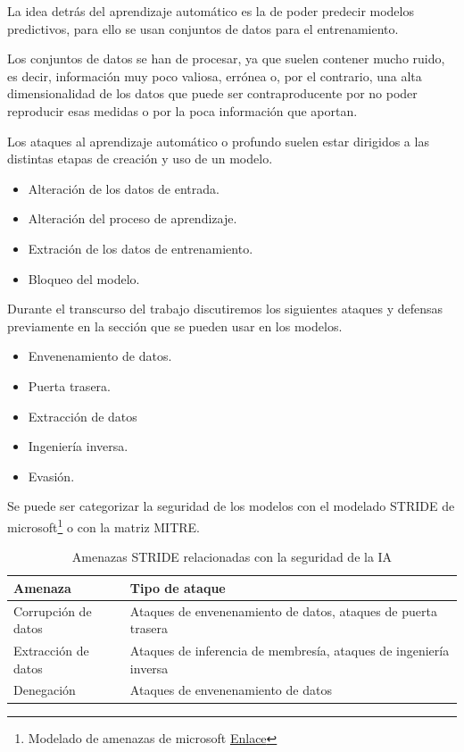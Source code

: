 La idea detrás del aprendizaje automático es la de poder predecir modelos predictivos, para ello se usan conjuntos de datos para el entrenamiento.

Los conjuntos de datos se han de procesar, ya que suelen contener mucho ruido, es decir, información muy poco valiosa, errónea o, por el contrario, una alta dimensionalidad de los datos que puede ser contraproducente por no poder reproducir esas medidas o por la poca información que aportan.

Los ataques al aprendizaje automático o profundo suelen estar dirigidos a las distintas etapas de creación y uso de un modelo.

\begin{itemize}
    \item Alteración de los datos de entrada.
    \item Alteración del proceso de aprendizaje.
    \item Extración de los datos de entrenamiento.
    \item Bloqueo del modelo.
\end{itemize}

Durante el transcurso del trabajo discutiremos los siguientes ataques y defensas previamente en la sección  que se pueden usar en los modelos.

\begin{itemize}
    \item Envenenamiento de datos.
    \item Puerta trasera.
    \item Extracción de datos
    \item Ingeniería inversa.
    \item Evasión.
\end{itemize}

Se puede ser categorizar la seguridad de los modelos con el modelado \gls{STRIDE} de microsoft\footnote{Modelado de amenazas de microsoft \href{https://learn.microsoft.com/es-es/azure/security/develop/threat-modeling-tool-threats}{Enlace}} o con la matriz \gls{MITRE}.

\begin{table}[H]
    \centering
    \small
    \def\arraystretch{1.5}
    \begin{tabular}{lp{10cm}}
        \toprule
        \textbf{Amenaza}    & \textbf{Tipo de ataque}                                           \\
        \midrule
        Corrupción de datos & Ataques de envenenamiento de datos, ataques de puerta trasera     \\
        Extracción de datos & Ataques de inferencia de membresía, ataques de ingeniería inversa \\
        Denegación          & Ataques de envenenamiento de datos                                \\
        \bottomrule
    \end{tabular}
    \caption{Amenazas STRIDE relacionadas con la seguridad de la IA}
    \label{tab:amenazas}
\end{table}

